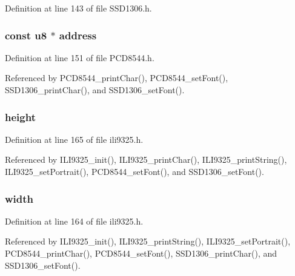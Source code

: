 Definition at line 143 of file S\-S\-D1306.\-h.

\hypertarget{structfont__t_ac601b72531c4bc309bb1d926491e4988}{
\subsubsection[{address}]{\setlength{\rightskip}{0pt plus 5cm}const {\bf u8} $\ast$ address}}\label{structfont__t_ac601b72531c4bc309bb1d926491e4988}


Definition at line 151 of file P\-C\-D8544.\-h.



Referenced by P\-C\-D8544\-\_\-print\-Char(), P\-C\-D8544\-\_\-set\-Font(), S\-S\-D1306\-\_\-print\-Char(), and S\-S\-D1306\-\_\-set\-Font().

\hypertarget{structfont__t_ac3f221619d1bd1d6f1d46727f0c913a2}{
\subsubsection[{height}]{ height}}\label{structfont__t_ac3f221619d1bd1d6f1d46727f0c913a2}


Definition at line 165 of file ili9325.\-h.



Referenced by I\-L\-I9325\-\_\-init(), I\-L\-I9325\-\_\-print\-Char(), I\-L\-I9325\-\_\-print\-String(), I\-L\-I9325\-\_\-set\-Portrait(), P\-C\-D8544\-\_\-set\-Font(), and S\-S\-D1306\-\_\-set\-Font().

\hypertarget{structfont__t_a2c1d87ba049f447519d1a92e6550f822}{
\subsubsection[{width}]{ width}}\label{structfont__t_a2c1d87ba049f447519d1a92e6550f822}


Definition at line 164 of file ili9325.\-h.



Referenced by I\-L\-I9325\-\_\-init(), I\-L\-I9325\-\_\-print\-String(), I\-L\-I9325\-\_\-set\-Portrait(), P\-C\-D8544\-\_\-print\-Char(), P\-C\-D8544\-\_\-set\-Font(), S\-S\-D1306\-\_\-print\-Char(), and S\-S\-D1306\-\_\-set\-Font().



